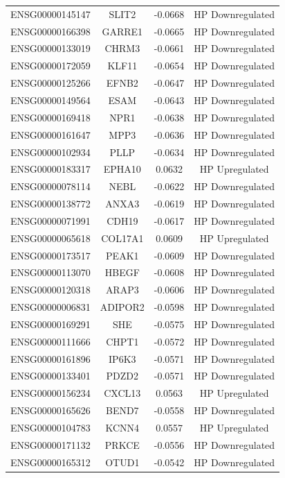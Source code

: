 \documentclass[
]{article}
\begin{document}
\begin{singlespace}
\begin{longtable}[t]{lccc}
ENSG00000145147 & SLIT2 & -0.0668 & HP Downregulated\\
\addlinespace
ENSG00000166398 & GARRE1 & -0.0665 & HP Downregulated\\
ENSG00000133019 & CHRM3 & -0.0661 & HP Downregulated\\
ENSG00000172059 & KLF11 & -0.0654 & HP Downregulated\\
ENSG00000125266 & EFNB2 & -0.0647 & HP Downregulated\\
ENSG00000149564 & ESAM & -0.0643 & HP Downregulated\\
\addlinespace
ENSG00000169418 & NPR1 & -0.0638 & HP Downregulated\\
ENSG00000161647 & MPP3 & -0.0636 & HP Downregulated\\
ENSG00000102934 & PLLP & -0.0634 & HP Downregulated\\
ENSG00000183317 & EPHA10 & 0.0632 & HP Upregulated\\
ENSG00000078114 & NEBL & -0.0622 & HP Downregulated\\
\addlinespace
ENSG00000138772 & ANXA3 & -0.0619 & HP Downregulated\\
ENSG00000071991 & CDH19 & -0.0617 & HP Downregulated\\
ENSG00000065618 & COL17A1 & 0.0609 & HP Upregulated\\
ENSG00000173517 & PEAK1 & -0.0609 & HP Downregulated\\
ENSG00000113070 & HBEGF & -0.0608 & HP Downregulated\\
\addlinespace
ENSG00000120318 & ARAP3 & -0.0606 & HP Downregulated\\
ENSG00000006831 & ADIPOR2 & -0.0598 & HP Downregulated\\
ENSG00000169291 & SHE & -0.0575 & HP Downregulated\\
ENSG00000111666 & CHPT1 & -0.0572 & HP Downregulated\\
ENSG00000161896 & IP6K3 & -0.0571 & HP Downregulated\\
\addlinespace
ENSG00000133401 & PDZD2 & -0.0571 & HP Downregulated\\
ENSG00000156234 & CXCL13 & 0.0563 & HP Upregulated\\
ENSG00000165626 & BEND7 & -0.0558 & HP Downregulated\\
ENSG00000104783 & KCNN4 & 0.0557 & HP Upregulated\\
ENSG00000171132 & PRKCE & -0.0556 & HP Downregulated\\
\addlinespace
ENSG00000165312 & OTUD1 & -0.0542 & HP Downregulated\\

\end{longtable}
\end{singlespace}
\end{document}
